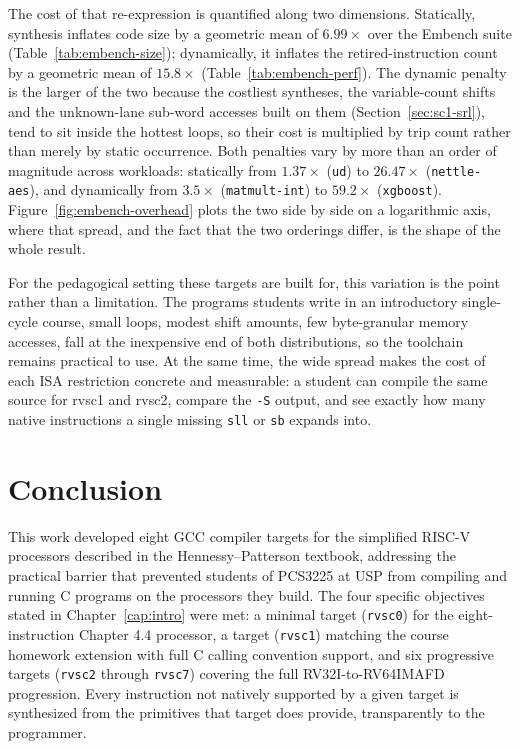 The cost of that re-expression is quantified along two dimensions. Statically, synthesis inflates
code size by a geometric mean of $6.99\times$ over the Embench suite
(Table~\ref{tab:embench-size}); dynamically, it inflates the retired-instruction count by a geometric
mean of $15.8\times$ (Table~\ref{tab:embench-perf}). The dynamic penalty is the larger of the two
because the costliest syntheses, the variable-count shifts and the unknown-lane sub-word accesses
built on them (Section~\ref{sec:sc1-srl}), tend to sit inside the hottest loops, so their cost is
multiplied by trip count rather than merely by static occurrence. Both penalties vary by more than an
order of magnitude across workloads: statically from $1.37\times$ (\texttt{ud}) to $26.47\times$
(\texttt{nettle-aes}), and dynamically from $3.5\times$ (\texttt{matmult-int}) to $59.2\times$
(\texttt{xgboost}). Figure~\ref{fig:embench-overhead} plots the two side by side on a logarithmic
axis, where that spread, and the fact that the two orderings differ, is the shape of the whole
result.



For the pedagogical setting these targets are built for, this variation is the point rather than a
limitation. The programs students write in an introductory single-cycle course, small loops, modest
shift amounts, few byte-granular memory accesses, fall at the inexpensive end of both distributions,
so the toolchain remains practical to use. At the same time, the wide spread makes the cost of each
ISA restriction concrete and measurable: a student can compile the same source for rvsc1 and rvsc2,
compare the \texttt{-S} output, and see exactly how many native instructions a single missing
\texttt{sll} or \texttt{sb} expands into.


\chapter{Conclusion} \label{cap:conclusion}

This work developed eight GCC compiler targets for the simplified RISC-V processors described in the
Hennessy--Patterson textbook, addressing the practical barrier that prevented students of PCS3225 at
USP from compiling and running C programs on the processors they build. The four specific objectives
stated in Chapter~\ref{cap:intro} were met: a minimal target (\texttt{rvsc0}) for the
eight-instruction Chapter 4.4 processor, a target (\texttt{rvsc1}) matching the course homework
extension with full C calling convention support, and six progressive targets (\texttt{rvsc2} through
\texttt{rvsc7}) covering the full RV32I-to-RV64IMAFD progression. Every instruction not natively
supported by a given target is synthesized from the primitives that target does provide, transparently
to the programmer.

